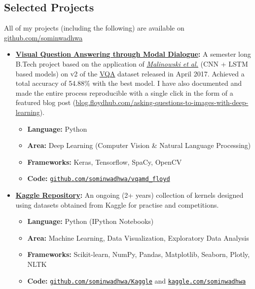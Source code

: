 \documentclass[margin,line]{res}
\begin{document}
\begin{resume}
\section{\sc Selected Projects}
All of my projects (including the following) are available on {\href{https://github.com/sominwadhwa}{github.com/sominwadhwa}}\\
\begin{itemize}[leftmargin=*]
\item {\bf {\href{https://github.com/sominwadhwa/vqamd_floyd}{Visual Question Answering through Modal Dialogue}:}}
A semester long B.Tech project based on the application of \textit{\href{https://arxiv.org/pdf/1505.01121.pdf}{\underline{Malinowski et al.}}} (CNN + LSTM based models) on v2 of the {\href{http://visualqa.org/}{\underline{VQA}}} dataset released in April 2017. Achieved a total accuracy of 54.88\% with the best model. I have also documented and made the entire process reproducible with a single click in the form of a featured blog post (\href{https://blog.floydhub.com/asking-questions-to-images-with-deep-learning/}{\underline{blog.floydhub.com/asking-questions-to-images-with-deep-learning}}).
\begin{itemize}[leftmargin=*]
\item {\bf Language:} Python
\item {\bf Area:} Deep Learning (Computer Vision \& Natural Language Processing)
\item {\bf Frameworks:} Keras, Tensorflow, SpaCy, OpenCV
\item {\bf Code:} {\href{https://github.com/sominwadhwa/vqamd_floyd}{\texttt{github.com/sominwadhwa/vqamd\_floyd}}}
\end{itemize}
\item {\bf {\href{https://github.com/sominwadhwa/Kaggle}{Kaggle Repository}:}}
An ongoing (2+ years) collection of kernels designed using datasets obtained from Kaggle for practise and competitions.
\begin{itemize}[leftmargin=*]
\item {\bf Language:} Python (IPython Notebooks)
\item {\bf Area:} Machine Learning, Data Visualization, Exploratory Data Analysis
\item {\bf Frameworks:} Scikit-learn, NumPy, Pandas, Matplotlib, Seaborn, Plotly, NLTK 
\item {\bf Code:} {\href{https://github.com/sominwadhwa/Kaggle}{\texttt{github.com/sominwadhwa/Kaggle}}} and {\href{https://www.kaggle.com/sominwadhwa}{\texttt{kaggle.com/sominwadhwa}}}

\end{itemize}
\end{itemize}
\end{resume}
\end{document}

